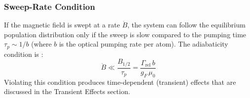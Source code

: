 \subsubsection*{Sweep-Rate Condition}
 
If the magnetic field is swept at a rate $\dot{B}$, the system can follow the equilibrium
population distribution only if the sweep is slow compared to the pumping time
$\tau_p \sim 1/b$ (where $b$ is the optical pumping rate per atom). The adiabaticity
condition is :
\begin{equation}
    \dot{B} \ll \frac{B_{1/2}}{\tau_p}
              = \frac{\Gamma_{\text{rel}}\,b}{g_F\,\mu_0}
    \label{eq:ZF_adiabatic}
\end{equation}
Violating this condition produces time-dependent (transient) effects that are discussed in the Transient Effects section.